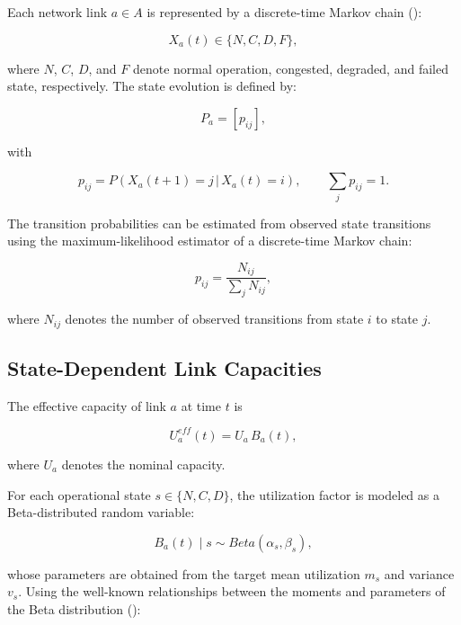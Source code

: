 \documentclass[a4paper,fleqn]{cas-dc}
\begin{document}
Each network link $a \in A$ is represented by a discrete-time Markov chain (\citealp{Norris1997}):

\begin{equation}
\nonumber X_a(t)\in\{N,C,D,F\},
\end{equation}

where $N$, $C$, $D$, and $F$ denote normal operation, congested, degraded, and failed state, respectively. The state evolution is defined by:

\begin{equation}
P_a= \left[p_{ij}\right],
\end{equation}

with

\begin{equation}
p_{ij}
= P\!\left(X_a(t+1)=j\,|\,X_a(t)=i\right),
\qquad
\sum_j p_{ij}=1.
\end{equation}


The transition probabilities can be estimated from observed state transitions using the maximum-likelihood estimator of a discrete-time Markov chain: 

\begin{equation} 
p_{ij} = \frac{N_{ij}} {\sum_j N_{ij}}, 
\end{equation} 

where \(N_{ij}\) denotes the number of observed transitions from state \(i\) to state \(j\).


\subsection*{State-Dependent Link Capacities}

The effective capacity of link $a$ at time $t$ is

\begin{equation}
U_a^{eff}(t)
=
U_a \, B_a(t),
\end{equation}

where $U_a$ denotes the nominal capacity.

For each operational state \(s\in\{N,C,D\}\), the utilization factor is modeled as a Beta-distributed random variable:

\[ 
B_a(t)\mid s \sim Beta(\alpha_s,\beta_s), 
\] 

whose parameters are obtained from the target mean utilization \(m_s\) and variance \(v_s\). Using the well-known relationships between the moments and parameters of the Beta distribution (\citealp{Johnson1995,Vose2008}): 
\end{document}
